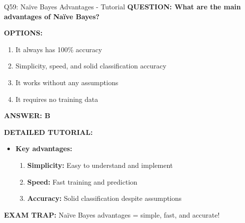 \documentclass[8pt]{beamer}
\begin{document}
	\begin{frame}{Q59: Naïve Bayes Advantages - Tutorial}
		\fontsize{6.5}{7.5}\selectfont
		\textbf{QUESTION: What are the main advantages of Naïve Bayes?}
		
		\vspace{0.1cm}
		\textbf{OPTIONS:}
		\begin{enumerate}
			\item It always has 100\% accuracy
			\item Simplicity, speed, and solid classification accuracy
			\item It works without any assumptions
			\item It requires no training data
		\end{enumerate}
		
		\vspace{0.1cm}
		\textcolor{myblue}{\textbf{ANSWER: B}}
		
		\vspace{0.1cm}
		\textbf{DETAILED TUTORIAL:}
		\begin{itemize}
			\item \textbf{Key advantages:}
			\begin{enumerate}
				\item \textbf{Simplicity:} Easy to understand and implement
				\item \textbf{Speed:} Fast training and prediction
				\item \textbf{Accuracy:} Solid classification despite assumptions
			\end{enumerate}
		\end{itemize}
		
		\textcolor{myred}{\textbf{EXAM TRAP:}} Naïve Bayes advantages = \textcolor{myblue}{simple, fast, and accurate}!
	\end{frame}
	
\end{document}
